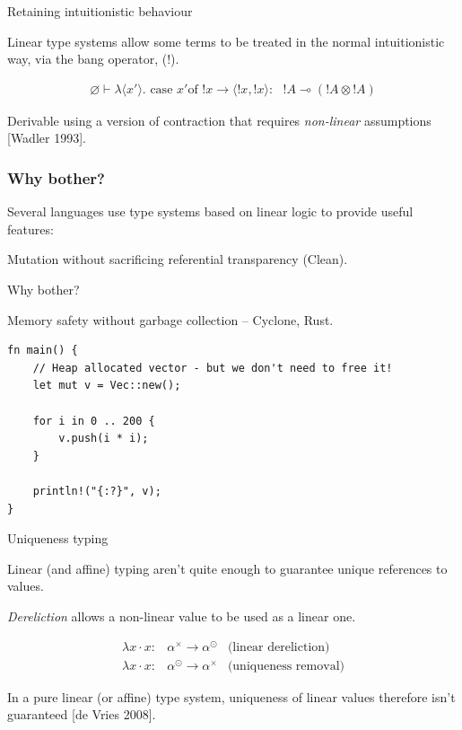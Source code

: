 \documentclass[10pt]{beamer}
\let\emptyset\varnothing
\newcommand{\case}{\text{ case }}
\newcommand{\of}{\text{of }}
\newcommand{\yields}{\multimap}
\begin{document}
\begin{frame}{Retaining intuitionistic behaviour}

Linear type systems allow some terms to be treated in the normal intuitionistic way, via the bang operator, (!).

\begin{eqnarray*}
\emptyset \vdash \lambda \langle x' \rangle . \case x' \of !x \rightarrow \langle !x, !x \rangle :\text{ } !A \yields (!A \otimes !A)
\end{eqnarray*}

Derivable using a version of contraction that requires \textit{non-linear} assumptions [Wadler 1993].

\end{frame}

\begin{frame}

\frametitle{Why bother?}

Several languages use type systems based on linear logic to provide useful features:

Mutation without sacrificing referential transparency (Clean).




\end{frame}

\begin{frame}[fragile]{Why bother?}

Memory safety without garbage collection -- Cyclone, Rust.

\begin{verbatim}
fn main() {
    // Heap allocated vector - but we don't need to free it!
    let mut v = Vec::new();

    for i in 0 .. 200 {
        v.push(i * i);
    }

    println!("{:?}", v);
}
\end{verbatim}

\end{frame}

\begin{frame}[fragile]{Uniqueness typing}

Linear (and affine) typing aren't quite enough to guarantee unique references to values.

\textit{Dereliction} allows a non-linear value to be used as a linear one.

\begin{eqnarray*}
\lambda x \cdot x : & \alpha^\times \rightarrow \alpha^\odot & \text{(linear dereliction)}\\
\lambda x \cdot x : & \alpha^\odot \rightarrow \alpha^\times & \text{(uniqueness removal)}
\end{eqnarray*}

In a pure linear (or affine) type system, uniqueness of linear values therefore isn't guaranteed [de Vries 2008].
\end{frame}
\end{document}
